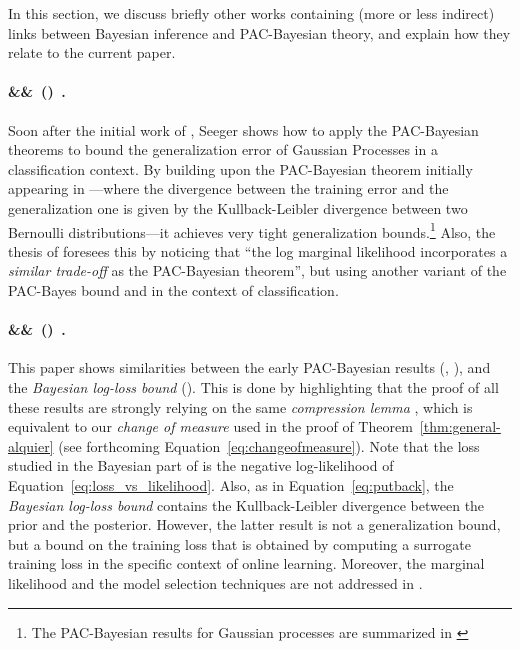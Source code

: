 \documentclass{article}
\theoremstyle{definition}
\theoremstyle{plain}
\newcommand{\citetA}{\citet}
\begin{document}
In this section, we discuss briefly other works containing (more or less indirect) links between Bayesian inference and PAC-Bayesian theory, and explain how they relate to the current paper.

\newcommand{\mycite}[2][]{\paragraph{\if&#1&\citeauthor{#2}\else#1\fi\ (\citeyear{#2}) \citep{#2}\,.}}
%
	\mycite[\citeauthor{seeger-02}]{seeger-02,seeger-thesis}
	 Soon after the initial  work of \citet{mcallester-99,mcallester-03a}, Seeger shows how to apply the PAC-Bayesian theorems to bound the generalization error of Gaussian Processes in a classification context.
   By building upon the PAC-Bayesian theorem initially appearing in \citetA{langford&seeger-01-techreport}---where the divergence between the training error and the generalization one is given by the Kullback-Leibler divergence between two Bernoulli distributions---it achieves very tight generalization bounds.\footnote{The PAC-Bayesian results for Gaussian processes are summarized in \citetA[Section~7.4]{rasmussen-06-book}}
   Also, the thesis of \citet[Section 3.2]{seeger-thesis} foresees this by noticing  that ``the log marginal likelihood incorporates a \emph{similar trade-off} as the PAC-Bayesian theorem'', but using another variant of the PAC-Bayes bound and in the context of classification.
%

\mycite{banerjee-06}
This paper shows similarities between the early PAC-Bayesian results (\citet{mcallester-03a}, \citetA{langford&seeger-01-techreport}), and the \emph{Bayesian log-loss bound}  (\citetA{freund-97,kakade-04}). This is done by highlighting that the proof of all these results are strongly relying on the same \emph{compression lemma} \citep[Lemma~1]{banerjee-06}, which is equivalent to our \emph{change of measure}  used in the proof of Theorem~\ref{thm:general-alquier} (see forthcoming Equation~\ref{eq:changeofmeasure}). 
%
Note that the loss studied in the Bayesian part of \citet{banerjee-06} is the negative log-likelihood of Equation~\eqref{eq:loss_vs_likelihood}. Also, as in Equation~\eqref{eq:putback}, the \emph{Bayesian log-loss bound} contains the Kullback-Leibler divergence between the prior and the posterior. However, the latter result is not a generalization bound, but a bound on the training loss that is obtained by computing a surrogate training loss in the specific context of online learning.
Moreover, the marginal likelihood and the model selection techniques are not addressed in \mbox{\citet{banerjee-06}.}
\end{document}
